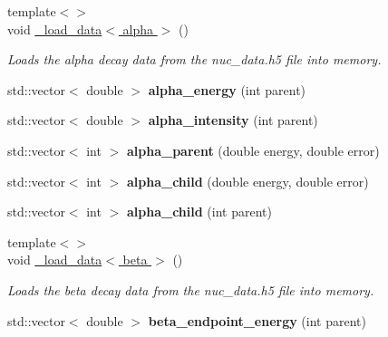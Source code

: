 \begin{DoxyCompactItemize}
\item 
{\footnotesize template$<$$>$ }\\void \hyperlink{namespacepyne_a673b0b45ebe0592568a4562122a18bbb}{\+\_\+load\+\_\+data$<$ alpha $>$} ()\hypertarget{namespacepyne_a673b0b45ebe0592568a4562122a18bbb}{}\label{namespacepyne_a673b0b45ebe0592568a4562122a18bbb}

\begin{DoxyCompactList}\small\item\em Loads the alpha decay data from the nuc\+\_\+data.\+h5 file into memory. \end{DoxyCompactList}\item 
std\+::vector$<$ double $>$ {\bfseries alpha\+\_\+energy} (int parent)\hypertarget{namespacepyne_a99b2ffce326da5691c5a9845160e2941}{}\label{namespacepyne_a99b2ffce326da5691c5a9845160e2941}

\item 
std\+::vector$<$ double $>$ {\bfseries alpha\+\_\+intensity} (int parent)\hypertarget{namespacepyne_a9060c732198093622687083cce03f9a8}{}\label{namespacepyne_a9060c732198093622687083cce03f9a8}

\item 
std\+::vector$<$ int $>$ {\bfseries alpha\+\_\+parent} (double energy, double error)\hypertarget{namespacepyne_a349b73b8c365292fc2b91d1e4fc64154}{}\label{namespacepyne_a349b73b8c365292fc2b91d1e4fc64154}

\item 
std\+::vector$<$ int $>$ {\bfseries alpha\+\_\+child} (double energy, double error)\hypertarget{namespacepyne_ad610784cfca1a49090a15daf49fe21c4}{}\label{namespacepyne_ad610784cfca1a49090a15daf49fe21c4}

\item 
std\+::vector$<$ int $>$ {\bfseries alpha\+\_\+child} (int parent)\hypertarget{namespacepyne_a80cd5a9276515010515462d27f500fbc}{}\label{namespacepyne_a80cd5a9276515010515462d27f500fbc}

\item 
{\footnotesize template$<$$>$ }\\void \hyperlink{namespacepyne_ac03b565590e9d917e4f93d65dac36db6}{\+\_\+load\+\_\+data$<$ beta $>$} ()\hypertarget{namespacepyne_ac03b565590e9d917e4f93d65dac36db6}{}\label{namespacepyne_ac03b565590e9d917e4f93d65dac36db6}

\begin{DoxyCompactList}\small\item\em Loads the beta decay data from the nuc\+\_\+data.\+h5 file into memory. \end{DoxyCompactList}\item 
std\+::vector$<$ double $>$ {\bfseries beta\+\_\+endpoint\+\_\+energy} (int parent)\hypertarget{namespacepyne_a1b55f98ecca83a9191eb30ee9ce6592b}{}\label{namespacepyne_a1b55f98ecca83a9191eb30ee9ce6592b}


\end{DoxyCompactItemize}
